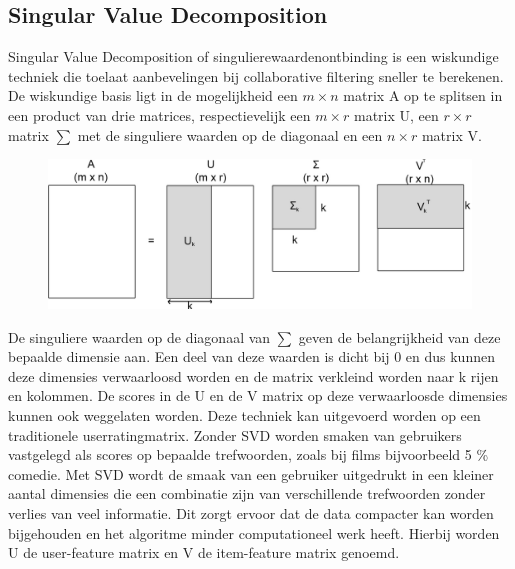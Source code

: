 \subsection{Singular Value Decomposition}
Singular Value Decomposition of singulierewaardenontbinding is een wiskundige techniek die toelaat aanbevelingen bij  collaborative filtering sneller te berekenen. De wiskundige basis ligt in de mogelijkheid een $m \times n$ matrix A op te splitsen in een product van drie matrices, respectievelijk een $m \times r$ matrix U, een $r \times r$ matrix $\sum$ met de singuliere waarden op de diagonaal en een $n \times r$ matrix V. 

\begin{figure}[htpb]   
    \label{Figuur::svd}      
  \begin{center}    
 \includegraphics[scale=0.3]{fig/svd}    
  \end{center}   
    
   \end{figure}

 De singuliere waarden op de diagonaal van $\sum$ geven de belangrijkheid van deze bepaalde dimensie aan. Een deel van deze waarden is dicht bij 0 en dus kunnen deze  dimensies verwaarloosd worden en de matrix verkleind worden naar k rijen en kolommen. De scores in de U en de V matrix op deze verwaarloosde dimensies kunnen ook weggelaten worden. 
Deze techniek kan uitgevoerd worden op een traditionele userratingmatrix. Zonder SVD worden smaken van gebruikers vastgelegd als scores op bepaalde trefwoorden, zoals bij films bijvoorbeeld 5 \% comedie. Met SVD wordt de smaak van een gebruiker uitgedrukt in een kleiner aantal dimensies die een combinatie zijn van verschillende trefwoorden zonder verlies van veel informatie. Dit zorgt ervoor dat de data compacter kan worden bijgehouden en het algoritme minder computationeel werk heeft. Hierbij worden U de user-feature matrix en V de item-feature matrix genoemd.


